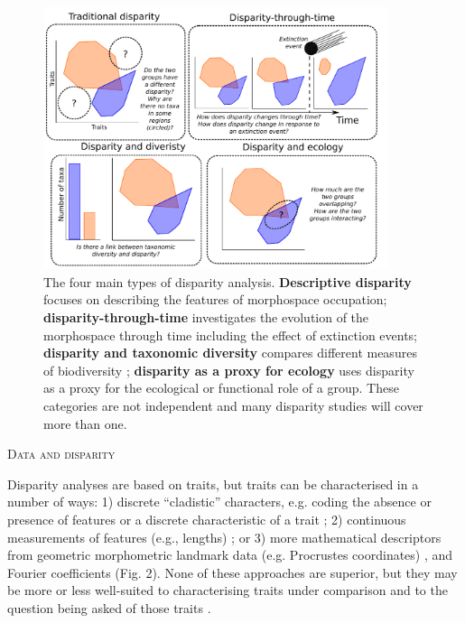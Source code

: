 \documentclass[12pt,letterpaper]{article}
\renewcommand{\section}[1]{%
\bigskip
\begin{center}
\begin{Large}
\normalfont\scshape #1
\medskip
\end{Large}
\end{center}}
\begin{document}
\begin{figure}[!htbp]
\centering
   \includegraphics[width=0.9\textwidth]{Figures/figure_disparities.pdf}
\caption{
    The four main types of disparity analysis. \textbf{Descriptive disparity} focuses on describing the features of morphospace occupation; \textbf{disparity-through-time} investigates the evolution of the morphospace through time including the effect of extinction events; \textbf{disparity and taxonomic diversity} compares different measures of biodiversity ; \textbf{disparity as a proxy for ecology} uses disparity as a proxy for the ecological or functional role of a group.
    These categories are not independent and many disparity studies will cover more than one.
}
\label{Fig:disparity}
\end{figure}



\section{Data and disparity}
\label{section:data}

\noindent Disparity analyses are based on traits, but traits can be characterised in a number of ways:
	1) discrete ``cladistic'' characters, e.g. coding the absence or presence of features or a discrete characteristic of a trait \citep[][e.g]{Close2015-qi};
	2) continuous measurements of features (e.g., lengths) \citep[][e.g]{Anderson2001-qb}; or
	3) more mathematical descriptors from geometric morphometric landmark data (e.g. Procrustes coordinates) \citep[][e.g]{Cooney2017-ly}, and Fourier coefficients \citep[][e.g]{Foote1995-do, Spriggs2018-nu} (Fig. 2).
None of these approaches are superior, but they may be more or less well-suited to characterising traits under comparison and to the question being asked of those traits \citep{hetherington2015cladistic,Hopkins2017-cf}.
\end{document}

